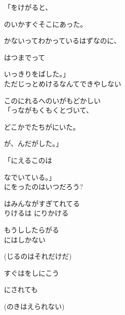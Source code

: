 「をけがると、

のいかすぐそこにあった。

かないってわかっているはずなのに、

はつまでって

いっきりをばした。」
\\

ただじっとめけるなんてできやしない

このにれるへのいがもどかしい
\\

「っながもくもくとづいて、

どこかでたちがにいた。

が、んだがした。」

「にえるこのは

なでいている。」
\\

にをったのはいつだろう?

はみんながすぎてれてる
\\

りけるは にりかける

もうししたらがる
\\

にはしかない

(じるのはそれだけだ)

すぐはをしにこう

にされても

(のきはえられない)

